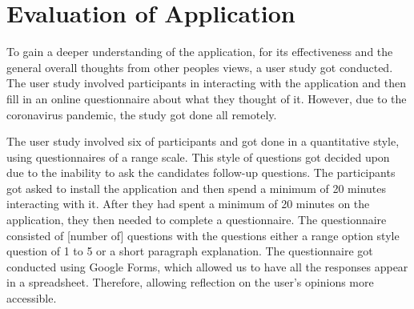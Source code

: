 			
	\section{Evaluation of Application}
		\label{sec:app_evaluation}
	
		To gain a deeper understanding of the application, for its effectiveness and the general overall thoughts from other peoples views, a user study got conducted. The user study involved participants in interacting with the application and then fill in an online questionnaire about what they thought of it. However, due to the coronavirus pandemic, the study got done all remotely.
		
		The user study involved six of participants and got done in a quantitative style, using questionnaires of a range scale. This style of questions got decided upon due to the inability to ask the candidates follow-up questions. The participants got asked to install the application and then spend a minimum of 20 minutes interacting with it. After they had spent a minimum of 20 minutes on the application, they then needed to complete a questionnaire. The questionnaire consisted of [number of] questions with the questions either a range option style question of 1 to 5 or a short paragraph explanation. The questionnaire got conducted using Google Forms, which allowed us to have all the responses appear in a spreadsheet. Therefore, allowing reflection on the user's opinions more accessible.
		